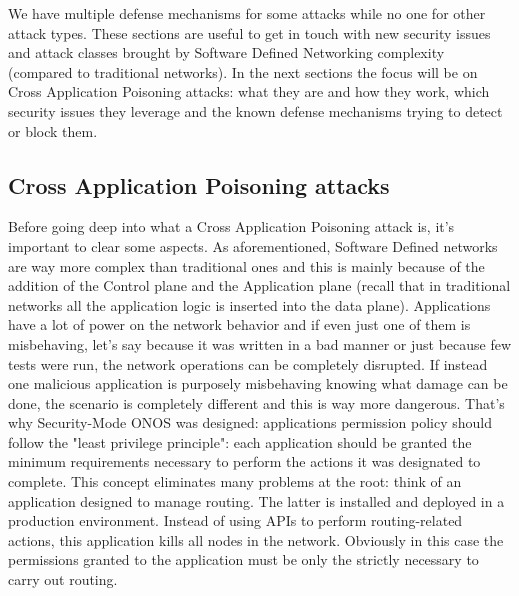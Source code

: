 \documentclass[a4paper,10pt]{memoir}
\begin{document}
We have multiple defense mechanisms for some attacks while no one for other attack types. These sections are useful to get in touch with new security issues and attack classes brought by Software Defined Networking complexity (compared to traditional networks). In the next sections the focus will be on Cross Application Poisoning attacks: what they are and how they work, which security issues they leverage and the known defense mechanisms trying to detect or block them.  

\subsection{Cross Application Poisoning attacks}
Before going deep into what a Cross Application Poisoning attack is, it's important to clear some aspects. As aforementioned, Software Defined networks are way more complex than traditional ones and this is mainly because of the addition of the Control plane and the Application plane (recall that in traditional networks all the application logic is inserted into the data plane). Applications have a lot of power on the network behavior and if even just one of them is misbehaving, let's say because it was written in a bad manner or just because few tests were run, the network operations can be completely disrupted. If instead one malicious application is purposely misbehaving knowing what damage can be done, the scenario is completely different and this is way more dangerous. That's why Security-Mode ONOS was designed: applications permission policy should follow the "least privilege principle": each application should be granted the minimum requirements necessary to perform the actions it was designated to complete. This concept eliminates many problems at the root: think of an application designed to manage routing. The latter is installed and deployed in a production environment. Instead of using APIs to perform routing-related actions, this application kills all nodes in the network. Obviously in this case the permissions granted to the application must be only the strictly necessary to carry out routing.
\end{document}
